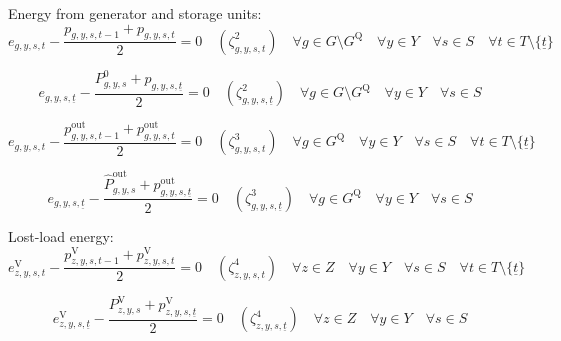 \documentclass{article}
\newcommand{\sGenerators}{G}
\newcommand{\sStorage}{G^{\mathrm{Q}}}
\newcommand{\sYears}{Y}
\newcommand{\sScenarios}{S}
\newcommand{\sIntervals}{T}
\newcommand{\sZones}{Z}
\newcommand{\iGenerator}{g}
\newcommand{\iYear}{y}
\newcommand{\iScenario}{s}
\newcommand{\iInterval}{t}
\newcommand{\iIntervalStart}{\underline{\iInterval}}
\newcommand{\iZone}{z}
\newcommand{\cPowerInitial}[1][\iGenerator,\iYear,\iScenario]{P_{#1}^{0}}
\newcommand{\cPowerOutInitial}[1][\iGenerator,\iYear,\iScenario]{\hat{P}_{#1}^{\mathrm{out}}}
\newcommand{\cLostLoadPowerInitial}[1][\iZone,\iYear,\iScenario]{P_{#1}^{\mathrm{V}}}
\newcommand{\vEnergy}[1][\iGenerator,\iYear,\iScenario,\iInterval]{e_{#1}}
\newcommand{\vPower}[1][\iGenerator,\iYear,\iScenario,\iInterval]{p_{#1}}
\newcommand{\vPowerOut}[1][\iGenerator,\iYear,\iScenario,\iInterval]{p^{\mathrm{out}}_{#1}}
\newcommand{\vLostLoadEnergy}[1][\iZone,\iYear,\iScenario,\iInterval]{e^{\mathrm{V}}_{#1}}
\newcommand{\vLostLoadPower}[1][\iZone,\iYear,\iScenario,\iInterval]{p^{\mathrm{V}}_{#1}}
\newcommand{\dGeneratorEnergyOutput}[1][\iGenerator,\iYear,\iScenario,\iInterval]{\zeta_{#1}^{2}}
\newcommand{\dStorageEnergyOutput}[1][\iGenerator,\iYear,\iScenario,\iInterval]{\zeta_{#1}^{3}}
\newcommand{\dLostLoadEnergy}[1][\iZone,\iYear,\iScenario,\iInterval]{\zeta_{#1}^{4}}
\begin{document}
Energy from generator and storage units:
\begin{equation}
	\vEnergy - \frac{\vPower[\iGenerator, \iYear,\iScenario,\iInterval-1] + \vPower}{2} = 0 \quad (\dGeneratorEnergyOutput) \quad \forall \iGenerator \in \sGenerators \setminus \sStorage \quad \forall \iYear \in \sYears \quad \forall \iScenario \in \sScenarios \quad \forall \iInterval \in \sIntervals \setminus \{\iIntervalStart\}
\end{equation}

\begin{equation}
	\vEnergy[\iGenerator, \iYear,\iScenario,\iIntervalStart] - \frac{\cPowerInitial + \vPower[\iGenerator, \iYear,\iScenario,\iIntervalStart]}{2} = 0 \quad (\dGeneratorEnergyOutput[\iGenerator, \iYear,\iScenario,\iIntervalStart]) \quad \forall \iGenerator \in \sGenerators \setminus \sStorage \quad \forall \iYear \in \sYears \quad \forall \iScenario \in \sScenarios
\end{equation}

\begin{equation}
	\vEnergy - \frac{\vPowerOut[\iGenerator, \iYear,\iScenario,\iInterval-1] + \vPowerOut}{2} = 0 \quad (\dStorageEnergyOutput) \quad \forall \iGenerator \in \sStorage \quad \forall \iYear \in \sYears \quad \forall \iScenario \in \sScenarios  \quad \forall \iInterval \in \sIntervals \setminus \{\iIntervalStart\}
\end{equation}

\begin{equation}
	\vEnergy[\iGenerator, \iYear,\iScenario,\iIntervalStart] - \frac{\cPowerOutInitial + \vPowerOut[\iGenerator, \iYear,\iScenario,\iIntervalStart]}{2} = 0 \quad (\dStorageEnergyOutput[\iGenerator, \iYear,\iScenario,\iIntervalStart]) \quad \forall \iGenerator \in \sStorage \quad \forall \iYear \in \sYears \quad \forall \iScenario \in \sScenarios
\end{equation}

Lost-load energy:
\begin{equation}
	\vLostLoadEnergy - \frac{\vLostLoadPower[\iZone, \iYear,\iScenario,\iInterval-1] + \vLostLoadPower}{2} = 0 \quad (\dLostLoadEnergy) \quad \forall \iZone \in \sZones \quad \forall \iYear \in \sYears \quad \forall \iScenario \in \sScenarios \quad \forall \iInterval \in \sIntervals \setminus \{\iIntervalStart\}
\end{equation}

\begin{equation}
	\vLostLoadEnergy[\iZone, \iYear,\iScenario,\iIntervalStart] - \frac{\cLostLoadPowerInitial + \vLostLoadPower[\iZone, \iYear,\iScenario,\iIntervalStart]}{2} = 0 \quad (\dLostLoadEnergy[\iZone, \iYear,\iScenario,\iIntervalStart]) \quad \forall \iZone \in \sZones \quad \forall \iYear \in \sYears \quad \forall \iScenario \in \sScenarios
\end{equation}
\end{document}
